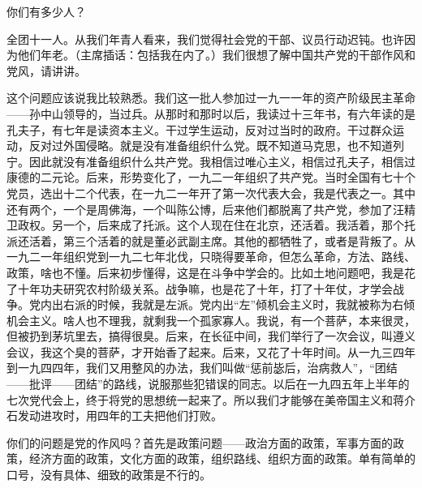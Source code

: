 你们有多少人？

全团十一人。从我们年青人看来，我们觉得社会党的干部、议员行动迟钝。也许因为他们年老。（主席插话：包括我在内了。）我们很想了解中国共产党的干部作风和党风，请讲讲。

这个问题应该说我比较熟悉。我们这一批人参加过一九一一年的资产阶级民主革命——孙中山领导的，当过兵。从那时和那时以后，我读过十三年书，有六年读的是孔夫子，有七年是读资本主义。干过学生运动，反对过当时的政府。干过群众运动，反对过外国侵略。就是没有准备组织什么党。既不知道马克思，也不知道列宁。因此就没有准备组织什么共产党。我相信过唯心主义，相信过孔夫子，相信过康德的二元论。后来，形势变化了，一九二一年组织了共产党。当时全国有七十个党员，选出十二个代表，在一九二一年开了第一次代表大会，我是代表之一。其中还有两个，一个是周佛海，一个叫陈公博，后来他们都脱离了共产党，参加了汪精卫政权。另一个，后来成了托派。这个人现在住在北京，还活着。我活着，那个托派还活着，第三个活着的就是董必武副主席。其他的都牺牲了，或者是背叛了。从一九二一年组织党到一九二七年北伐，只晓得要革命，但怎么革命，方法、路线、政策，啥也不懂。后来初步懂得，这是在斗争中学会的。比如土地问题吧，我是花了十年功夫研究农村阶级关系。战争嘛，也是花了十年，打了十年仗，才学会战争。党内出右派的时候，我就是左派。党内出“左”倾机会主义时，我就被称为右倾机会主义。啥人也不理我，就剩我一个孤家寡人。我说，有一个菩萨，本来很灵，但被扔到茅坑里去，搞得很臭。后来，在长征中间，我们举行了一次会议，叫遵义会议，我这个臭的菩萨，才开始香了起来。后来，又花了十年时间。从一九三四年到一九四四年，我们又用整风的办法，我们叫做“惩前毖后，治病救人”，“团结——批评——团结”的路线，说服那些犯错误的同志。以后在一九四五年上半年的七次党代会上，终于将党的思想统一起来了。所以我们才能够在美帝国主义和蒋介石发动进攻时，用四年的工夫把他们打败。

你们的问题是党的作风吗？首先是政策问题——政治方面的政策，军事方面的政策，经济方面的政策，文化方面的政策，组织路线、组织方面的政策。单有简单的口号，没有具体、细致的政策是不行的。

